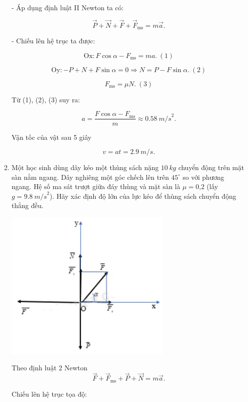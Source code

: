 \begin{enumerate}[label=\bfseries Bài \arabic*:]
{		- Áp dụng định luật II Newton ta có:
		
		$$\vec P + \vec N + \vec F + \vec F_\text{ms} = m\vec a.$$
		
		- Chiếu lên hệ trục ta được:
		
		$$\text{Ox}: F \cos \alpha - F_\text{ms} = ma.\ (1)$$
		
		$$\text{Oy}: - P + N + F \sin \alpha = 0 \Rightarrow N = P - F\sin \alpha.\ (2)$$
		
		$$F_\text{ms} = \mu N.\ (3)$$
		
		Từ (1), (2), (3) suy ra:
		
		$$a = \dfrac{F \cos \alpha - F_\text{ms}}{m} \approx \SI{0,58}{m/s}^2.$$
		
		Vận tốc của vật sau 5 giây
		
		$$v = at = \SI{2,9}{m/s}.$$
		
		
	}

	\item {}
	
	
	{
		Một học sinh dùng dây kéo một thùng sách nặng $\SI{10}{kg}$ chuyển động trên mặt sàn nằm ngang. Dây nghiêng một góc chếch lên trên $45^\circ$ so với phương ngang. Hệ số ma sát trượt giữa đáy thùng và mặt sàn là $\mu = \text{0,2}$ (lấy $g = \SI{9,8}{m/s}^2$). Hãy xác định độ lớn của lực kéo để thùng sách chuyển động thẳng đều.
	}
	
	\hideall
	{
		
		\begin{center}
			\includegraphics[scale=1]{../figs/VN10-2022-PH-TP021-12.jpg}
		\end{center}
		
		Theo định luật 2 Newton
		$$\vec F +\vec F_\text{ms} + \vec P + \vec N = m\vec a.$$
		
		Chiếu lên hệ trục tọa độ:
		
}
\end{enumerate}
